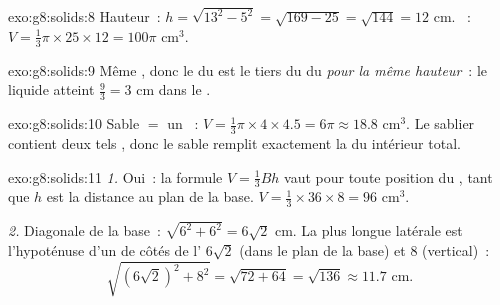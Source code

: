 \begin{solution}{exo:g8:solids:8}
Hauteur~: $h = \sqrt{13^2 - 5^2} = \sqrt{169 - 25} = \sqrt{144} = 12$
cm. ~: $V = \frac13 \pi \times 25 \times 12 = 100\pi$ cm$^3$.
\end{solution}

\begin{solution}{exo:g8:solids:9}
Même , donc le  du  est le tiers du  du 
\emph{pour la même hauteur}~: le liquide atteint $\frac{9}{3} = 3$ cm
dans le .
\end{solution}

\begin{solution}{exo:g8:solids:10}
Sable $=$ un ~: $V = \frac13 \pi \times 4 \times 4.5 = 6\pi
\approx 18.8$ cm$^3$. Le sablier contient deux tels , donc le
sable remplit exactement la  du  intérieur total.
\end{solution}

\begin{solution}{exo:g8:solids:11}
\emph{1.} Oui~: la formule $V = \frac13 Bh$ vaut pour toute position
du , tant que $h$ est la distance  au plan de la
base. $V = \frac13 \times 36 \times 8 = 96$ cm$^3$.

\emph{2.} Diagonale de la base~: $\sqrt{6^2 + 6^2} = 6\sqrt2$ cm. La
plus longue  latérale est l'hypoténuse d'un  de
côtés de l' $6\sqrt2$ (dans le plan de la base) et $8$
(vertical)~:
\[
\sqrt{(6\sqrt2)^2 + 8^2} = \sqrt{72 + 64} = \sqrt{136} \approx 11.7
\text{ cm}.
\]
\end{solution}


